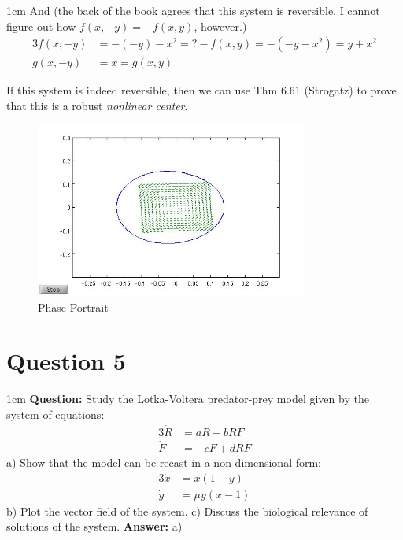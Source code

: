 \documentclass[12pt]{article}
\newenvironment{myenv}{\begin{adjustwidth}{1cm}{}}{\end{adjustwidth}}
\begin{document}
\begin{myenv}
And (the back of the book agrees that this system is reversible. I cannot figure out how $f(x,-y) = -f(x,y)$, however.)
\begin{alignat*}{3}
f(x,-y) &= - (-y) - x^2 =? -f(x,y) = -(-y-x^2) = y+x^2 \\
g(x,-y) &= x = g(x,y)
\end{alignat*}

If this system is indeed reversible, then we can use Thm 6.61 (Strogatz) to prove that this is a robust \emph{nonlinear center}.


\begin{figure} [H]
    \centering
    \includegraphics[width=0.8\textwidth]{Question4_Center}
    \caption{ Phase Portrait}
    \label{figure:a0}
\end{figure}
\end{myenv}

\section*{Question 5}
\begin{myenv}
\textbf{Question:} Study the Lotka-Voltera predator-prey model given by the system of equations:
\begin{alignat*}{3}
\dot{R} &= aR - bRF \\
\dot{F} &= -cF + dRF
\end{alignat*}
a) Show that the model can be recast in a non-dimensional form:
\begin{alignat*}{3}
\dot{x} &= x(1-y) \\
\dot{y} &= \mu y(x-1)
\end{alignat*}
b) Plot the vector field of the system.
c) Discuss the biological relevance of solutions of the system.
\textbf{Answer:} 
a) 


\end{myenv}
\end{document}
